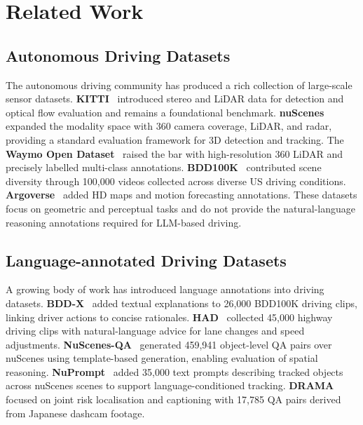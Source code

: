 \section{Related Work}
\label{sec:related_work}

\subsection{Autonomous Driving Datasets}
\label{ssec:rw_datasets}

The autonomous driving community has produced a rich collection of large-scale
sensor datasets. \textbf{KITTI}~\cite{geiger2012we} introduced stereo and LiDAR
data for detection and optical flow evaluation and remains a foundational benchmark.
\textbf{nuScenes}~\cite{caesar2020nuscenes} expanded the modality space with
360\textdegree{} camera coverage, LiDAR, and radar, providing a standard evaluation
framework for 3D detection and tracking. The \textbf{Waymo Open Dataset}~\cite{sun2020scalability}
raised the bar with high-resolution 360\textdegree{} LiDAR and precisely labelled
multi-class annotations. \textbf{BDD100K}~\cite{yu2020bdd100k} contributed scene
diversity through 100,000 videos collected across diverse US driving conditions.
\textbf{Argoverse}~\cite{chang2019argoverse} added HD maps and motion forecasting
annotations. These datasets focus on geometric and perceptual tasks and do not
provide the natural-language reasoning annotations required for LLM-based driving.

\subsection{Language-annotated Driving Datasets}
\label{ssec:rw_lang}

A growing body of work has introduced language annotations into driving datasets.
\textbf{BDD-X}~\cite{kim2018textual} added textual explanations to 26,000 BDD100K
driving clips, linking driver actions to concise rationales. \textbf{HAD}~\cite{chen2019had}
collected 45,000 highway driving clips with natural-language advice for lane changes
and speed adjustments. \textbf{NuScenes-QA}~\cite{qian2024nuscenes_qa} generated
459,941 object-level QA pairs over nuScenes using template-based generation, enabling
evaluation of spatial reasoning. \textbf{NuPrompt}~\cite{wu2024nuprompt} added 35,000
text prompts describing tracked objects across nuScenes scenes to support
language-conditioned tracking. \textbf{DRAMA}~\cite{malla2023drama} focused on
joint risk localisation and captioning with 17,785 QA pairs derived from Japanese
dashcam footage.

